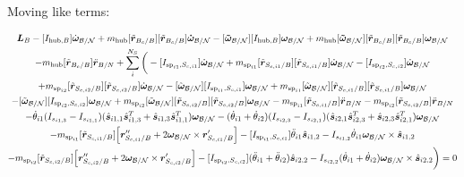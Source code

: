 \documentclass[paper]{aiaaNew}
\begin{document}
Moving like terms:

\begin{multline}
\bm L_B -[I_{\text{hub},B}] \dot{\bm\omega}_{\cal B/N} + m_{\text{hub}} [\tilde{{\bm r}}_{B_c/B}] [\tilde{{\bm r}}_{B_c/B}] \bm{\dot{\omega}}_{\cal B/N} -[\bm{\tilde{\omega}}_{\cal B/N}] [I_{\text{hub},B}] \bm\omega_{\cal B/N} + m_{\text{hub}} [\bm{\tilde{\omega}}_{\cal B/N}] [\tilde{{\bm r}}_{B_c/B}] [\tilde{{\bm r}}_{B_c/B}]\bm\omega_{\cal B/N} \\
 - m_{\text{hub}} [\tilde{{\bm r}}_{B_c/B}] \ddot{\bm r}_{B/N} 
+ \sum\limits_{i}^{N_S}\bigg(-[I_{\text{sp}_{i1},S_{c,i1}}] \dot{\bm \omega}_{\cal{B/N}} + m_{\text{sp}_{i1}} [\tilde{{\bm r}}_{S_{c,i1}/B}] [\tilde{\bm{r}}_{S_{c,i1}/B}] \dot{\bm\omega}_{\cal B/N} -[I_{\text{sp}_{i2},S_{c,i2}}] \dot{\bm \omega}_{\cal{B/N}} \\
+ m_{\text{sp}_{i2}} [\tilde{{\bm r}}_{S_{c,i2}/B}] [\tilde{\bm{r}}_{S_{c,i2}/B}] \dot{\bm\omega}_{\cal B/N}
  -[\tilde{\bm \omega}_{\cal{B/N}}] [I_{\text{sp}_{i1},S_{c,i1}}] \bm \omega_{\cal{B/N}}
  + m_{\text{sp}_{i1}} [\tilde{\bm \omega}_{\cal{B/N}}] [\tilde{{\bm r}}_{S_{c,i1}/B}] [\tilde{{\bm r}}_{S_{c,i1}/B}] \bm\omega_{\cal B/N}
  \\
  -[\tilde{\bm \omega}_{\cal{B/N}}] [I_{\text{sp}_{i2},S_{c,i2}}] \bm \omega_{\cal{B/N}} + m_{\text{sp}_{i2}} [\tilde{\bm \omega}_{\cal{B/N}}] [\tilde{{\bm r}}_{S_{c,i2}/B}] [\tilde{{\bm r}}_{S_{c,i2}/B}] \bm\omega_{\cal B/N}
- m_{\text{sp}_{i1}} [\tilde{{\bm r}}_{S_{c,i1}/B}] \ddot{\bm r}_{B/N}- m_{\text{sp}_{i2}} [\tilde{{\bm r}}_{S_{c,i2}/B}] \ddot{\bm r}_{B/N}\\
-\dot{\theta}_{i1} (I_{s_{i1,3}} - I_{s_{i1,1}})( \hat{\bm s}_{i1,1} \hat{\bm s}_{i1,3}^T + \hat{\bm s}_{i1,3} \hat{\bm s}_{i1,1}^T) \bm \omega_{\cal{B/N}} -(\dot{\theta}_{i1}  + \dot{\theta}_{i2})(I_{s_{i2,3}} - I_{s_{i2,1}}) (\hat{\bm s}_{i2,1} \hat{\bm s}_{i2,3}^T + \hat{\bm s}_{i2,3} \hat{\bm s}_{i2,1}^T) \bm \omega_{\cal{B/N}} \\
- m_{\text{sp}_{i1}} [\tilde{{\bm r}}_{S_{c,i1}/B}] \Big[\bm{r}''_{S_{c,i1}/B} + 2 \bm\omega_{\cal B/N} \times \bm{r}'_{S_{c,i1}/B}\Big]
-[I_{\text{sp}_{i1},S_{c,i1}}] \ddot{\theta}_{i1} \hat{\bm s}_{i1,2} 
-I_{s_{i1,2}} \dot{\theta}_{i1} \bm \omega_{\cal{B/N}} \times \hat{\bm s}_{i1,2}\\
- m_{\text{sp}_{i2}} [\tilde{{\bm r}}_{S_{c,i2}/B}] \Big[ \bm{r}''_{S_{c,i2}/B} + 2 \bm\omega_{\cal B/N} \times \bm{r}'_{S_{c,i2}/B}\Big]
-[I_{\text{sp}_{i2},S_{c,i2}}] (\ddot{\theta}_{i1}  + \ddot{\theta}_{i2})\hat{\bm s}_{i2,2} 
-I_{s_{i2,2}}  (\dot{\theta}_{i1}  + \dot{\theta}_{i2}) \bm \omega_{\cal{B/N}} \times \hat{\bm s}_{i2,2} \bigg) = 0
\end{multline}
\end{document}
